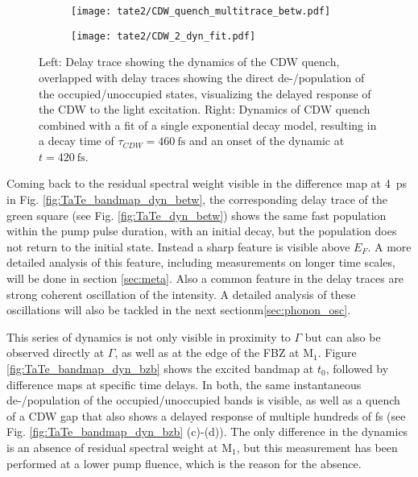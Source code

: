 \begin{figure}[t!]
	\centering
	\begin{subfigure}[b]{0.33\textwidth}
		\texttt{[image: tate2/CDW\_quench\_multitrace\_betw.pdf]}
		\caption{}
	\end{subfigure}
	\begin{subfigure}[b]{0.33\textwidth}
		\texttt{[image: tate2/CDW\_2\_dyn\_fit.pdf]}
		\caption{}
	\end{subfigure}
	\caption{Left: Delay trace showing the dynamics of the CDW quench, overlapped with delay traces showing the direct de-/population of the occupied/unoccupied states, visualizing the delayed response of the CDW to the light excitation. Right: Dynamics of CDW quench combined with a fit of a single exponential decay model, resulting in a decay time of $\tau_{CDW}=\qty{460}{\femto\second}$ and an onset of the dynamic at $t=\qty{420}{\femto\second}$.}
	\label{fig:TaTe_CDW_comp}
\end{figure}

Coming back to the residual spectral weight visible in the difference map at \qty{4}{\pico\second} in Fig. \ref{fig:TaTe_bandmap_dyn_betw}, the corresponding delay trace of the green square (see Fig. \ref{fig:TaTe_dyn_betw}) shows the same fast population within the pump pulse duration, with an initial decay, but the population does not return to the initial state.
Instead a sharp feature is visible above $E_F$.
A more detailed analysis of this feature, including measurements on longer time scales, will be done in section \ref{sec:meta}.
Also a common feature in the delay traces are strong coherent oscillation of the intensity.
A detailed analysis of these oscillations will also be tackled in the next sectionm\ref{sec:phonon_osc}.

This series of dynamics is not only visible in proximity to $\Gamma$ but can also be observed directly at $\Gamma$, as well as at the edge of the FBZ at M$_1$.
Figure \ref{fig:TaTe_bandmap_dyn_bzb} shows the excited bandmap at $t_0$, followed by difference maps at specific time delays.
In both, the same instantaneous de-/population of the occupied/unoccupied bands is visible, as well as a quench of a CDW gap that also shows a delayed response of multiple hundreds of \unit{\femto\second} (see Fig. \ref{fig:TaTe_bandmap_dyn_bzb} (c)-(d)).
The only difference in the dynamics is an absence of residual spectral weight at M$_1$, but this measurement has been performed at a lower pump fluence, which is the reason for the absence.

